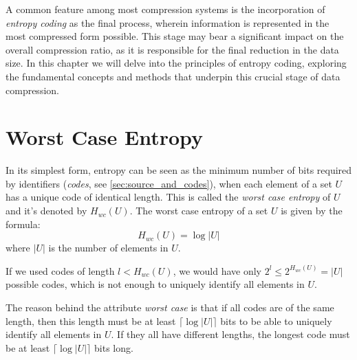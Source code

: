 \noindent A common feature among most compression systems is the incorporation of \emph{entropy coding} as the final process, wherein information is represented in the most compressed form possible. This stage may bear a significant impact on the overall compression ratio, as it is responsible for the final reduction in the data size. In this chapter we will delve into the principles of entropy coding, exploring the fundamental concepts and methods that underpin this crucial stage of data compression.

\section*{Worst Case Entropy}
In its simplest form, entropy can be seen as the minimum number of bits required by identifiers (\emph{codes}, see \autoref{sec:source_and_codes}), when each element of a set $U$ has a unique code of identical length. This is called the \emph{worst case entropy} of $U$ and it's denoted by $H_{wc}(U)$. The worst case entropy of a set $U$ is given by the formula:
\begin{equation}
    H_{wc}(U) =  \log |U|
\end{equation}
where $|U|$ is the number of elements in $U$.

\begin{remark}
    If we used codes of length $l < H_{wc} (U)$, we would have only $2^l \leq 2^{H_{wc}(U)} = |U|$ possible codes, which is not enough to uniquely identify all elements in $U$.
\end{remark}

\noindent The reason behind the attribute \emph{worst case} is that if all codes are of the same length, then this length must be at least $\lceil \log |U| \rceil$ bits to be able to uniquely identify all elements in $U$. If they all have different lengths, the longest code must be at least $\lceil \log |U| \rceil$ bits long.

